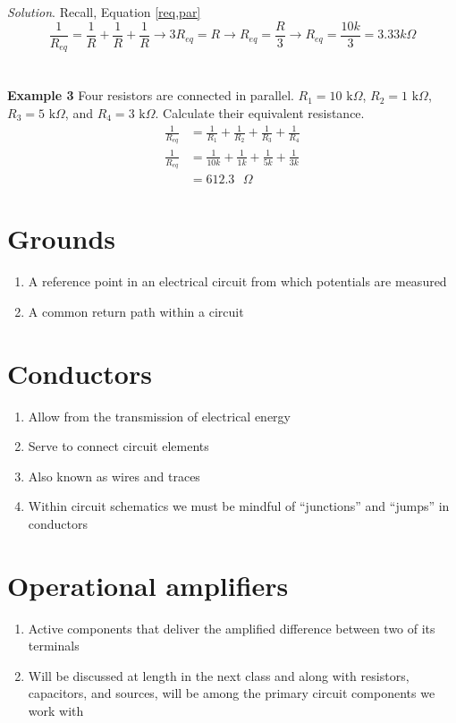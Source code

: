 \documentclass[11pt]{book}
\begin{document}
\textit{Solution}.
Recall, Equation \ref{req,par}
\begin{equation}
	\frac{1}{R_{eq}} = \frac{1}{R} + \frac{1}{R} + \frac{1}{R} \rightarrow 3R_{eq} = R \rightarrow R_{eq} = \frac{R}{3} \rightarrow R_{eq} = \frac{10k}{3} = 3.33 k\Omega
\end{equation}
\\
\\
\textbf{Example 3}
Four resistors are connected in parallel. $R_1 = 10 \text{ k}\Omega$, $R_2 = 1 \text{ k}\Omega$, $R_3 = 5 \text{ k}\Omega$, and $R_4 = 3 \text{ k}\Omega$. Calculate their equivalent resistance.
\begin{align}
	\frac{1}{R_{eq}} &= \frac{1}{R_1} + \frac{1}{R_2} + \frac{1}{R_3} + \frac{1}{R_4} \\
	\frac{1}{R_{eq}} &= \frac{1}{10k} + \frac{1}{1k} + \frac{1}{5k} + \frac{1}{3k} \\
	&= 612.3 \text{ }\Omega
\end{align}

\section{Grounds}
\begin{enumerate}
	\item A reference point in an electrical circuit from which potentials are measured
	\item A common return path within a circuit
\end{enumerate}


\section{Conductors}
\begin{enumerate}
	\item Allow from the transmission of electrical energy
	\item Serve to connect circuit elements
	\item Also known as wires and traces
	\item Within circuit schematics we must be mindful of ``junctions'' and ``jumps'' in conductors
\end{enumerate}


\section{Operational amplifiers}
\begin{enumerate}
	\item Active components that deliver the amplified difference between two of its terminals
	\item Will be discussed at length in the next class and along with resistors, capacitors, and sources, will be among the primary circuit components we work with
\end{enumerate}
\end{document}

